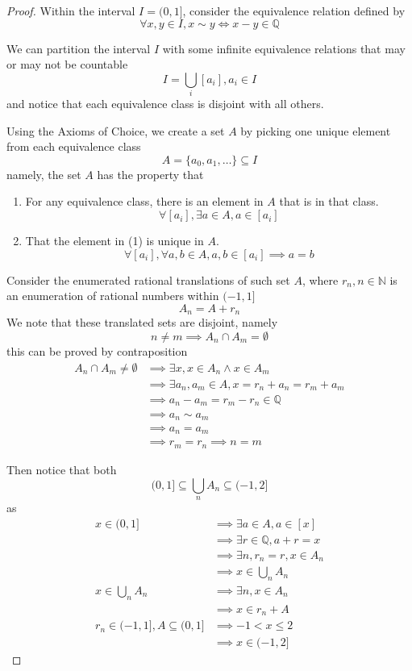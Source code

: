 \documentclass{article}
\begin{document}
\begin{proof}
    Within the interval $I = (0,1]$, consider the equivalence relation defined by
    \[
        \forall x, y \in I, x \sim y \iff x - y \in \mathbb{Q}
    \]

    We can partition the interval $I$ with some infinite equivalence relations that may or may not be countable
    \[
        I = \bigcup_{i} [a_i], a_i \in I
    \]
    and notice that each equivalence class is disjoint with all others.

    Using the Axioms of Choice, we create a set $A$ by picking one unique element from each equivalence class
    \[
        A = \{a_0, a_1, \dots\} \subseteq I
    \]
    namely, the set $A$ has the property that
    \begin{enumerate}
        \item For any equivalence class, there is an element in $A$ that is in that class.
        \[
        \forall [a_i], \exists a \in A, a \in [a_i]
        \]
        \item That the element in (1) is unique in $A$.
        \[
            \forall [a_i], \forall a, b \in A, a,b \in [a_i] \implies a = b
        \]
    \end{enumerate}


    Consider the enumerated rational translations of such set $A$, where $r_n, n \in \mathbb{N}$ is an enumeration of rational numbers within $(-1, 1]$
    \[
        A_n = A + r_n
    \]
    We note that these translated sets are disjoint, namely
    \[
        n \neq m \implies A_n \cap A_m = \emptyset
    \]
    this can be proved by contraposition
    \begin{align*}
        A_n \cap A_m \neq \emptyset &\implies \exists x, x \in A_n \land x \in A_m\\
        &\implies \exists a_n, a_m \in A, x = r_n + a_n = r_m + a_m\\
        &\implies a_n - a_m = r_m - r_n \in \mathbb{Q}\\
        &\implies a_n \sim a_m\\
        &\implies a_n = a_m\\
        &\implies r_m = r_n \implies n = m
    \end{align*}

    Then notice that both
    \[
        (0, 1] \subseteq \bigcup_n A_n \subseteq (-1, 2]
    \]
    as
    \begin{align*}
        x \in (0, 1] &\implies \exists a \in A, a \in [x]\\ &\implies \exists r \in \mathbb{Q}, a + r = x\\
        &\implies \exists n, r_n = r, x \in A_n\\
        &\implies x \in \bigcup_n A_n\\
        x \in \bigcup_n A_n &\implies \exists n, x \in A_n\\
        &\implies x \in r_n + A\\
        r_n \in (-1, 1], A \subseteq (0, 1] &\implies -1 < x \leq 2\\
        &\implies x \in (-1, 2]
    \end{align*}



\end{proof}
\end{document}
